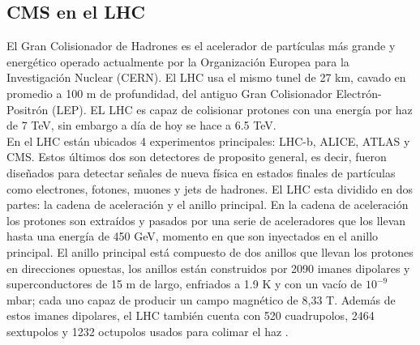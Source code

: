 \subsection{CMS en el LHC}

El Gran Colisionador de Hadrones es el acelerador de partículas más grande y energético operado actualmente por la Organización Europea para la Investigación Nuclear (CERN). El LHC usa el mismo tunel de 27 km, cavado en promedio a 100 m de profundidad, del antiguo Gran Colisionador Electrón-Positrón (LEP). EL LHC es capaz de colisionar protones con una energía por haz de 7 TeV, sin embargo a día de hoy se hace a 6.5 TeV.
\\

En el LHC están ubicados 4 experimentos principales: LHC-b, ALICE, ATLAS y CMS. Estos últimos dos son detectores de proposito general, es decir, fueron diseñados para detectar señales de nueva física en estados finales de partículas como electrones, fotones, muones y jets de hadrones. El LHC esta dividido en dos partes: la cadena de aceleración y el anillo principal. En la cadena de aceleración los protones son extraídos y pasados por una serie de aceleradores que los llevan hasta una energía de 450 GeV, momento en que son inyectados en el anillo principal. El anillo principal está compuesto de dos anillos que llevan los protones en direcciones opuestas, los anillos están construidos por 2090 imanes dipolares y superconductores de 15 m de largo, enfriados a 1.9 K y con un vacío de $10^{-9}$mbar; cada uno capaz de producir un campo magnético de 8,33 T. Además de estos imanes dipolares, el LHC también cuenta con 520 cuadrupolos, 2464 sextupolos y 1232 octupolos usados para colimar el haz \cite{Jose}. 
\\
\\

